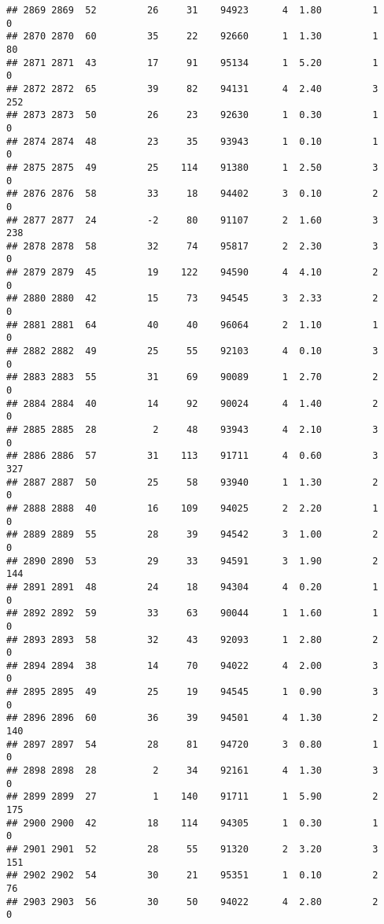 \documentclass[
]{article}
\begin{document}
\begin{verbatim}
## 2869 2869  52         26     31    94923      4  1.80         1        0
## 2870 2870  60         35     22    92660      1  1.30         1       80
## 2871 2871  43         17     91    95134      1  5.20         1        0
## 2872 2872  65         39     82    94131      4  2.40         3      252
## 2873 2873  50         26     23    92630      1  0.30         1        0
## 2874 2874  48         23     35    93943      1  0.10         1        0
## 2875 2875  49         25    114    91380      1  2.50         3        0
## 2876 2876  58         33     18    94402      3  0.10         2        0
## 2877 2877  24         -2     80    91107      2  1.60         3      238
## 2878 2878  58         32     74    95817      2  2.30         3        0
## 2879 2879  45         19    122    94590      4  4.10         2        0
## 2880 2880  42         15     73    94545      3  2.33         2        0
## 2881 2881  64         40     40    96064      2  1.10         1        0
## 2882 2882  49         25     55    92103      4  0.10         3        0
## 2883 2883  55         31     69    90089      1  2.70         2        0
## 2884 2884  40         14     92    90024      4  1.40         2        0
## 2885 2885  28          2     48    93943      4  2.10         3        0
## 2886 2886  57         31    113    91711      4  0.60         3      327
## 2887 2887  50         25     58    93940      1  1.30         2        0
## 2888 2888  40         16    109    94025      2  2.20         1        0
## 2889 2889  55         28     39    94542      3  1.00         2        0
## 2890 2890  53         29     33    94591      3  1.90         2      144
## 2891 2891  48         24     18    94304      4  0.20         1        0
## 2892 2892  59         33     63    90044      1  1.60         1        0
## 2893 2893  58         32     43    92093      1  2.80         2        0
## 2894 2894  38         14     70    94022      4  2.00         3        0
## 2895 2895  49         25     19    94545      1  0.90         3        0
## 2896 2896  60         36     39    94501      4  1.30         2      140
## 2897 2897  54         28     81    94720      3  0.80         1        0
## 2898 2898  28          2     34    92161      4  1.30         3        0
## 2899 2899  27          1    140    91711      1  5.90         2      175
## 2900 2900  42         18    114    94305      1  0.30         1        0
## 2901 2901  52         28     55    91320      2  3.20         3      151
## 2902 2902  54         30     21    95351      1  0.10         2       76
## 2903 2903  56         30     50    94022      4  2.80         2        0

\end{verbatim}
\end{document}
